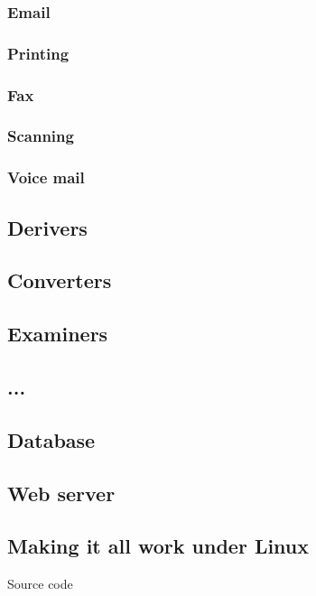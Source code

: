 \subsubsection{Email}
\subsubsection{Printing}
\subsubsection{Fax}
\subsubsection{Scanning}
\subsubsection{Voice mail}

\subsection{Derivers}

\subsection{Converters}

\subsection{Examiners}

\subsection{...}


\subsection{Database}

\subsection{Web server}

\subsection{Making it all work under Linux}
   
Source code


